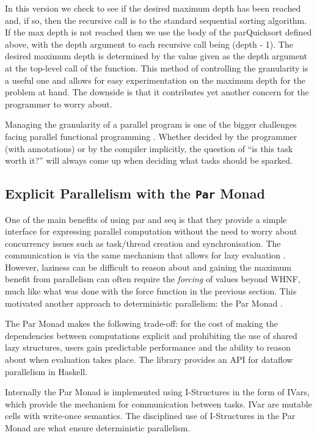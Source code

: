     In this version we check to see if the desired maximum depth has been
reached and, if so, then the recursive call is to the standard sequential sorting
algorithm. If the max depth is not reached then we use the body of the
parQuicksort defined above, with the depth argument to each recursive call being
\<(depth - 1)\>. The desired maximum depth is determined by the value given as
the depth argument at the top-level call of the function. This method of
controlling the granularity is a useful one and allows for easy experimentation
on the maximum depth for the problem at hand. The downside is that it
contributes yet another concern for the programmer to worry about.


Managing the granularity of a parallel program is one of the bigger challenges
facing parallel functional programming \citep{SPJ:PIFPL}. Whether decided by
the programmer (with annotations) or by the compiler implicitly, the question
of ``is this task worth it?'' will always come up when deciding what tasks
should be sparked.

\subsection{Explicit Parallelism with the \texttt{Par} Monad}

One of the main benefits of using \<par\> and \<seq\> is that they provide a
simple interface for expressing parallel computation without the need to worry
about concurrency issues such as task/thread creation and synchronisation. The
communication is via the same mechanism that allows for lazy evaluation
\citep{SPJ:PIFPL}. However, laziness can be difficult to reason about and
gaining the maximum benefit from parallelism can often require the
\emph{forcing} of values beyond WHNF, much like what was done with the
\<force\> function in the previous section.  This motivated another approach to
deterministic parallelism: the \<Par\> Monad \citep{marlow2011monad}.

The \<Par\> Monad makes the following trade-off: for the cost of making the
dependencies between computations explicit and prohibiting the use of shared
lazy structures, users gain predictable performance and the ability to reason
about when evaluation takes place. The library provides an API for dataflow
parallelism in Haskell.

Internally the \<Par\> Monad is implemented using I-Structures
\citep{Arvind:IStructures} in the form of \<IVar\>s, which provide the
mechanism for communication between tasks. \<IVar\> are mutable cells with
write-once semantics.  The disciplined use of I-Structures in the \<Par\> Monad
are what ensure deterministic parallelism.


